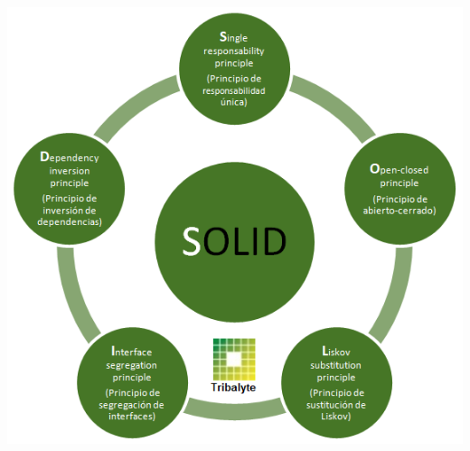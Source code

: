 \begin{enumerate}[1.]
	
\begin{center}
\includegraphics[scale=0.50]{./Imagenes/img12.png} 
\end{center}


\end{enumerate}